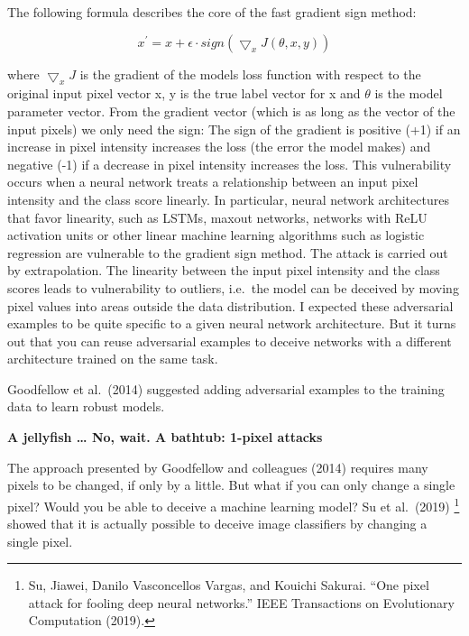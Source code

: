 \documentclass[
  11pt,
]{scrbook}
\begin{document}
The following formula describes the core of the fast gradient sign method:

\[x^\prime=x+\epsilon\cdot{}sign(\bigtriangledown_x{}J(\theta,x,y))\]

where \(\bigtriangledown_x{}J\) is the gradient of the models loss function with respect to the original input pixel vector x, y is the true label vector for x and \(\theta\) is the model parameter vector.
From the gradient vector (which is as long as the vector of the input pixels) we only need the sign:
The sign of the gradient is positive (+1) if an increase in pixel intensity increases the loss (the error the model makes) and negative (-1) if a decrease in pixel intensity increases the loss.
This vulnerability occurs when a neural network treats a relationship between an input pixel intensity and the class score linearly.
In particular, neural network architectures that favor linearity, such as LSTMs, maxout networks, networks with ReLU activation units or other linear machine learning algorithms such as logistic regression are vulnerable to the gradient sign method.
The attack is carried out by extrapolation.
The linearity between the input pixel intensity and the class scores leads to vulnerability to outliers, i.e.~the model can be deceived by moving pixel values into areas outside the data distribution.
I expected these adversarial examples to be quite specific to a given neural network architecture.
But it turns out that you can reuse adversarial examples to deceive networks with a different architecture trained on the same task.

Goodfellow et al.~(2014) suggested adding adversarial examples to the training data to learn robust models.

\textbf{A jellyfish \ldots{} No, wait. A bathtub: 1-pixel attacks}

The approach presented by Goodfellow and colleagues (2014) requires many pixels to be changed, if only by a little.
But what if you can only change a single pixel?
Would you be able to deceive a machine learning model?
Su et al.~(2019) \footnote{Su, Jiawei, Danilo Vasconcellos Vargas, and Kouichi Sakurai. ``One pixel attack for fooling deep neural networks.'' IEEE Transactions on Evolutionary Computation (2019).} showed that it is actually possible to deceive image classifiers by changing a single pixel.
\end{document}
